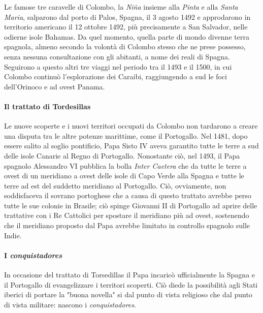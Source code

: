 \documentclass[11pt]{report}
\begin{document}
	Le famose tre caravelle di Colombo, la \textit{Niña} insieme alla \textit{Pinta} e alla \textit{Santa Maria}, salparono dal porto di Palos, Spagna, il 3 agosto 1492 e approdarono in territorio americano il 12 ottobre 1492, più precisamente a San Salvador, nelle odierne isole Bahamas. Da quel momento, quella parte di mondo divenne terra spagnola, almeno secondo la volontà di Colombo stesso che ne prese possesso, senza nessuna consultazione con gli abitanti, a nome dei reali di Spagna. Seguirono a questo altri tre viaggi nel periodo tra il 1493 e il 1500, in cui Colombo continuò l'esplorazione dei Caraibi, raggiungendo a sud le foci dell'Orinoco e ad ovest Panama.
	
	\paragraph*{Il trattato di Tordesillas}
	
	Le nuove scoperte e i nuovi territori occupati da Colombo non tardarono a creare una disputa tra le altre potenze marittime, come il Portogallo. Nel 1481, dopo essere salito al soglio pontificio, Papa Sisto IV aveva garantito tutte le terre a sud delle isole Canarie al Regno di Portogallo. Nonostante ciò, nel 1493, il Papa spagnolo Alessandro VI pubblica la bolla \textit{Inter Caetera} che da tutte le terre a ovest di un meridiano a ovest delle isole di Capo Verde alla Spagna e tutte le terre ad est del suddetto meridiano al Portogallo. Ciò, ovviamente, non soddisfaceva il sovrano portoghese che a causa di questo trattato avrebbe perso tutte le sue colonie in Brasile; ciò spinge Giovanni II di Portogallo ad aprire delle trattative con i Re Cattolici per spostare il meridiano più ad ovest, sostenendo che il meridiano proposto dal Papa avrebbe limitato in controllo spagnolo sulle Indie.\cite{parry2010age} 
	
	\paragraph*{I \textit{conquistadores}}
	
	In occasione del trattato di Torsedillas il Papa incaricò ufficialmente la Spagna e il Portogallo di evangelizzare i territori scoperti. Ciò diede la possibilità agli Stati iberici di portare la "buona novella" si dal punto di vista religioso che dal punto di vista militare: nascono i \textit{conquistadores}.
	
	
	{\small }
	
\end{document}
